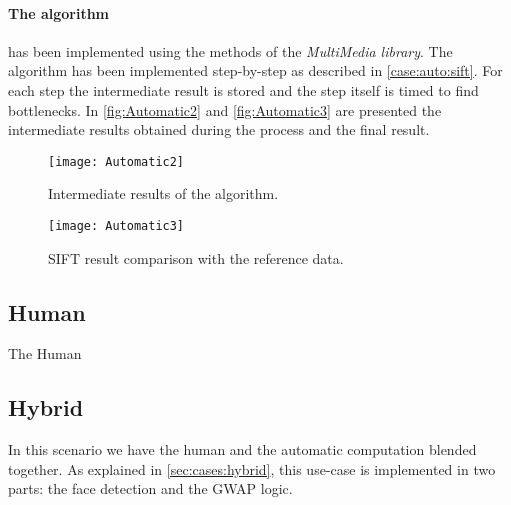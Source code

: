 \paragraph{The algorithm} has been implemented using the methods of the
\emph{MultiMedia library}. The algorithm has been implemented step-by-step
as described in \ref{case:auto:sift}. For each step the intermediate result
is stored and the step itself is timed to find bottlenecks. In
\autoref{fig:Automatic2} and \autoref{fig:Automatic3} are presented the
intermediate results obtained during the process and the final result.
\begin{figure}[htb]
    \centering
    \texttt{[image: Automatic2]}
    \caption{Intermediate results of the algorithm.}
    \label{fig:Automatic2}
\end{figure}

\begin{figure}[htb]
    \centering
    \texttt{[image: Automatic3]}
    \caption{\acs{SIFT} result comparison with the reference data.}
    \label{fig:Automatic3}
\end{figure}






















\subsection{Human}
The Human





















\subsection{Hybrid}
In this scenario we have the human and the automatic computation blended together.
As explained in \ref{sec:cases:hybrid}, this use-case is implemented in two
parts: the face detection and the \ac{GWAP} logic.\\

